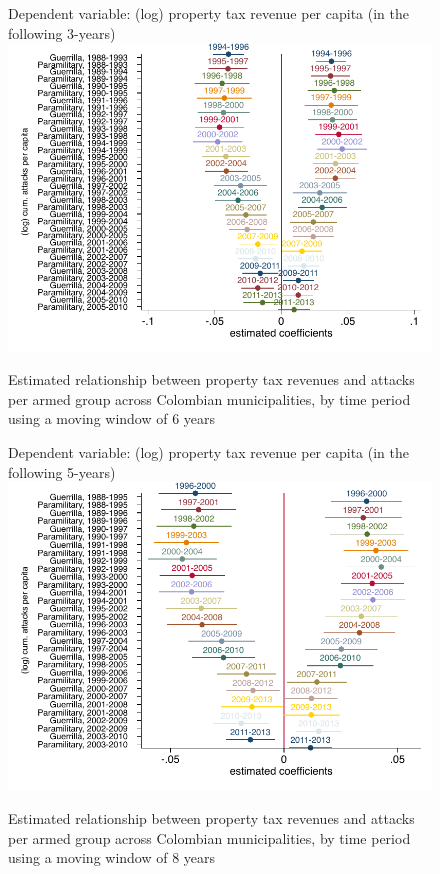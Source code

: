 \begin{figure}[H]
\begin{center}
\caption{Estimated relationship between property tax revenues and attacks per armed group across Colombian municipalities, by time period using a moving window of 6 years}
\label{appendix3:moving_window_6years}
\small{Dependent variable: (log) property tax revenue per capita (in the following 3-years)}
\includegraphics[width=1\textwidth]{Chapter3/Figures/figureE7.pdf}
\end{center}
\end{figure}


\begin{figure}[H]
\begin{center}
\caption{Estimated relationship between property tax revenues and attacks per armed group across Colombian municipalities, by time period using a moving window of 8 years}
\small{Dependent variable: (log) property tax revenue per capita (in the following 5-years)}
\label{appendix3:moving_window_8years}
\includegraphics[width=1\textwidth]{Chapter3/Figures/figureE8.pdf}
\end{center}
\end{figure}

